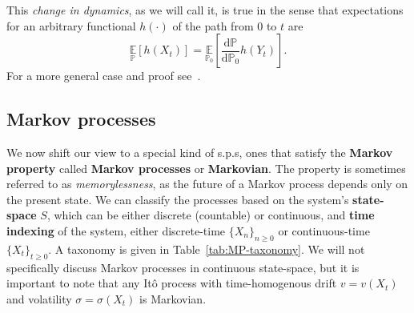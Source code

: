 \noindent
This \emph{change in dynamics}, as we will call it, is true in the sense that expectations for an arbitrary functional $h(\cdot)$ of the path from $0$ to $t$ are
\begin{equation}
	\label{eq:girsanov_consequence}
	\underset{\mathbb{P}}{\mathbb{E}}\left[h(X_t)\right] = \underset{\mathbb{P}_0}{\mathbb{E}}\left[\frac{\mathrm{d} \mathbb{P}}{\mathrm{d} \mathbb{P}_0} h(Y_t)\right]. 
\end{equation}
For a more general case and proof see~\cite{sarkka2019applied}.

\subsection{Markov processes}
We now shift our view to a special kind of s.p.s, ones that satisfy the \textbf{Markov property} called \textbf{Markov processes} or \textbf{Markovian}. The property is sometimes referred to as \emph{memorylessness}, as the future of a Markov process depends only on the present state. We can classify the processes based on the system's \textbf{state-space} $S$, which can be either discrete (countable) or continuous, and \textbf{time indexing} of the system, either discrete-time $\{X_n\}_{n \geq 0}$ or continuous-time $\{X_t\}_{t \geq 0}$. A taxonomy is given in Table~\ref{tab:MP-taxonomy}. We will not specifically discuss Markov processes in continuous state-space, but it is important to note that any It\^ o process with time-homogenous drift $v = v(X_t)$ and volatility $\sigma = \sigma(X_t)$ is Markovian.

